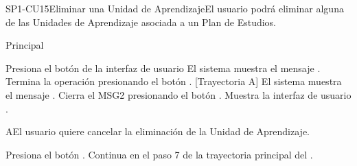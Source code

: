 \begin{UseCase}{SP1-CU15}{Eliminar  una Unidad de Aprendizaje}{El usuario podrá eliminar alguna de las Unidades de Aprendizaje asociada a un Plan de Estudios.}
\end{UseCase}

\begin{UCtrayectoria}{Principal}
    
    \UCpaso[\UCactor] Presiona el botón  de la interfaz de usuario 
    \UCpaso El sistema muestra el mensaje .
    \UCpaso[\UCactor] Termina la operación presionando el botón . [Trayectoria A] 
    \UCpaso El sistema muestra el mensaje .   
    \UCpaso[\UCactor] Cierra el MSG2 presionando el botón .
    \UCpaso Muestra la interfaz de usuario .
\end{UCtrayectoria}


\begin{UCtrayectoriaA}{A}{El usuario quiere cancelar la eliminación de la Unidad de Aprendizaje.}

    \UCpaso[\UCactor] Presiona el botón .
    \UCpaso Continua en el paso 7 de la trayectoria principal del .
    
\end{UCtrayectoriaA}